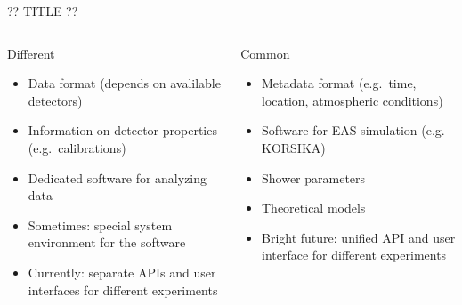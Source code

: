 \documentclass[18pt]{beamer}
\begin{document}
\begin{frame}{?? TITLE ??}
\begin{columns}
  \begin{column}[t]{0.49\textwidth}
    \begin{block}{Different}
      \begin{itemize}
        \item Data format (depends on avalilable detectors)
        \item Information on detector properties (e.g.\ calibrations)
        \item Dedicated software for analyzing data
        \item Sometimes: special system environment for the software
        \item \textcolor{red!50!black}{Currently}: separate APIs and user interfaces for different experiments
      \end{itemize}
    \end{block}
  \end{column}
  \hfill
  \begin{column}[t]{0.49\textwidth}
    \begin{block}{Common}
      \begin{itemize}
        \item Metadata format (e.g.\ time, location, atmospheric conditions)
        \item Software for EAS simulation (e.g. KORSIKA)
        \item Shower parameters
        \item Theoretical models
        \item \textcolor{blue!50!black}{Bright future}: unified API and user interface for different experiments
      \end{itemize}
    \end{block}
  \end{column}
\end{columns}
\end{frame}
\end{document}
